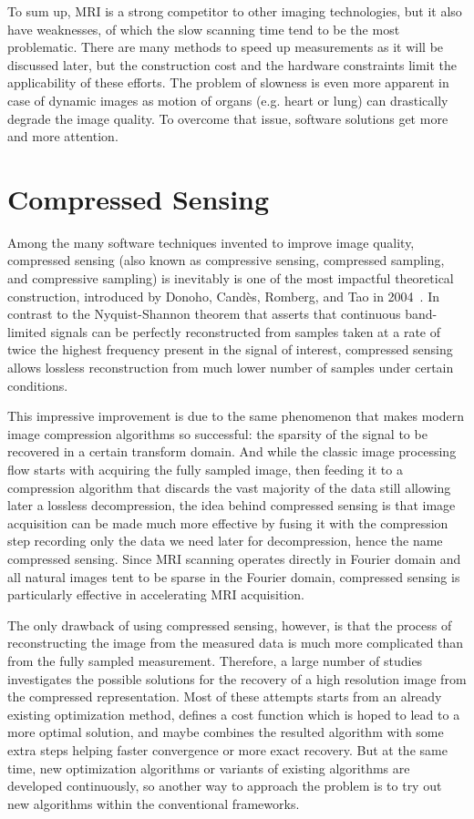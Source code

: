 To sum up, MRI is a strong competitor to other imaging technologies, but it also have weaknesses, of which the slow scanning time tend to be the most problematic. There are many methods to speed up measurements as it will be discussed later, but the construction cost and the hardware constraints limit the applicability of these efforts. The problem of slowness is even more apparent in case of dynamic images as motion of organs (e.g. heart or lung) can drastically degrade the image quality. To overcome that issue, software solutions get more and more attention.

\section{Compressed Sensing}

Among the many software techniques invented to improve image quality, compressed sensing (also known as compressive sensing, compressed sampling, and compressive sampling) is inevitably is one of the most impactful theoretical construction, introduced by Donoho, Candès, Romberg, and Tao in 2004~\cite{candes_robust_2006, donoho_compressed_2006, candes_nearoptimal_2006}. In contrast to the Nyquist-Shannon theorem that asserts that continuous band-limited signals can be perfectly reconstructed from samples taken at a rate of twice the highest frequency present in the signal of interest, compressed sensing allows lossless reconstruction from much lower number of samples under certain conditions.

This impressive improvement is due to the same phenomenon that makes modern image compression algorithms so successful: the sparsity of the signal to be recovered in a certain transform domain. And while the classic image processing flow starts with acquiring the fully sampled image, then feeding it to a compression algorithm that discards the vast majority of the data still allowing later a lossless decompression, the idea behind compressed sensing is that image acquisition can be made much more effective by fusing it with the compression step recording only the data we need later for decompression, hence the name compressed sensing. Since MRI scanning operates directly in Fourier domain and all natural images tent to be sparse in the Fourier domain, compressed sensing is particularly effective in accelerating MRI acquisition.

The only drawback of using compressed sensing, however, is that the process of reconstructing the image from the measured data is much more complicated than from the fully sampled measurement. Therefore, a large number of studies investigates the possible solutions for the recovery of a high resolution image from the compressed representation. Most of these attempts starts from an already existing optimization method, defines a cost function which is hoped to lead to a more optimal solution, and maybe combines the resulted algorithm with some extra steps helping faster convergence or more exact recovery. But at the same time, new optimization algorithms or variants of existing algorithms are developed continuously, so another way to approach the problem is to try out new algorithms within the conventional frameworks.

